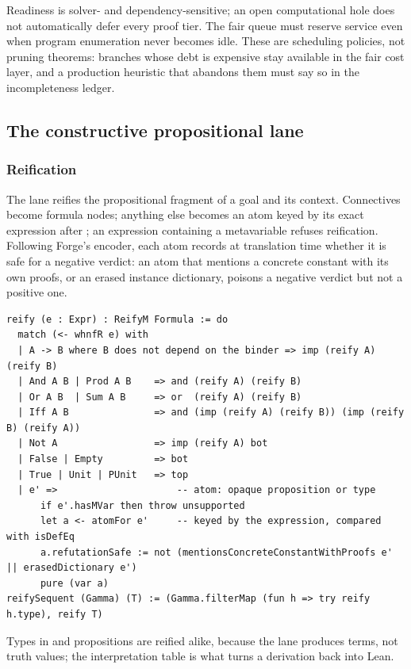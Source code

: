 Readiness is solver- and dependency-sensitive; an open computational hole does not automatically defer every proof tier. The fair queue must reserve service even when program enumeration never becomes idle. These are scheduling policies, not pruning theorems: branches whose debt is expensive stay available in the fair cost layer, and a production heuristic that abandons them must say so in the incompleteness ledger.

\subsection{The constructive propositional lane}\label{alg:prop-lane}

\subsubsection{Reification}

The lane reifies the propositional fragment of a goal and its context. Connectives become formula nodes; anything else becomes an atom keyed by its exact expression after ; an expression containing a metavariable refuses reification. Following Forge's encoder, each atom records at translation time whether it is safe for a negative verdict: an atom that mentions a concrete constant with its own proofs, or an erased instance dictionary, poisons a negative verdict but not a positive one\cite{forge}.
\begin{lstlisting}
reify (e : Expr) : ReifyM Formula := do
  match (<- whnfR e) with
  | A -> B where B does not depend on the binder => imp (reify A) (reify B)
  | And A B | Prod A B    => and (reify A) (reify B)
  | Or A B  | Sum A B     => or  (reify A) (reify B)
  | Iff A B               => and (imp (reify A) (reify B)) (imp (reify B) (reify A))
  | Not A                 => imp (reify A) bot
  | False | Empty         => bot
  | True | Unit | PUnit   => top
  | e' =>                     -- atom: opaque proposition or type
      if e'.hasMVar then throw unsupported
      let a <- atomFor e'     -- keyed by the expression, compared with isDefEq
      a.refutationSafe := not (mentionsConcreteConstantWithProofs e' || erasedDictionary e')
      pure (var a)
reifySequent (Gamma) (T) := (Gamma.filterMap (fun h => try reify h.type), reify T)
\end{lstlisting}

Types in  and propositions are reified alike, because the lane produces terms, not truth values; the interpretation table  is what turns a derivation back into Lean.

